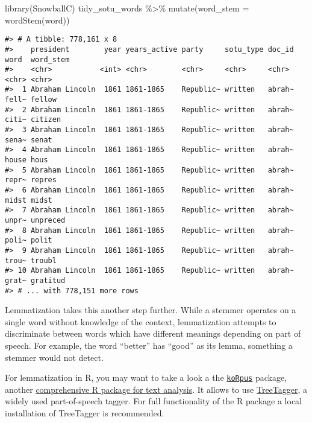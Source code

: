 \documentclass[
]{book}
\newenvironment{Shaded}{\begin{snugshade}}{\end{snugshade}}
\newcommand{\AttributeTok}[1]{\textcolor[rgb]{0.77,0.63,0.00}{#1}}
\newcommand{\FunctionTok}[1]{\textcolor[rgb]{0.00,0.00,0.00}{#1}}
\newcommand{\NormalTok}[1]{#1}
\newcommand{\SpecialCharTok}[1]{\textcolor[rgb]{0.00,0.00,0.00}{#1}}
\begin{document}
\begin{Shaded}
\begin{Highlighting}[]
\FunctionTok{library}\NormalTok{(SnowballC)}
\NormalTok{tidy\_sotu\_words }\SpecialCharTok{\%\textgreater{}\%}
        \FunctionTok{mutate}\NormalTok{(}\AttributeTok{word\_stem =} \FunctionTok{wordStem}\NormalTok{(word))}
\end{Highlighting}
\end{Shaded}

\begin{verbatim}
#> # A tibble: 778,161 x 8
#>    president        year years_active party     sotu_type doc_id word  word_stem
#>    <chr>           <int> <chr>        <chr>     <chr>     <chr>  <chr> <chr>    
#>  1 Abraham Lincoln  1861 1861-1865    Republic~ written   abrah~ fell~ fellow   
#>  2 Abraham Lincoln  1861 1861-1865    Republic~ written   abrah~ citi~ citizen  
#>  3 Abraham Lincoln  1861 1861-1865    Republic~ written   abrah~ sena~ senat    
#>  4 Abraham Lincoln  1861 1861-1865    Republic~ written   abrah~ house hous     
#>  5 Abraham Lincoln  1861 1861-1865    Republic~ written   abrah~ repr~ repres   
#>  6 Abraham Lincoln  1861 1861-1865    Republic~ written   abrah~ midst midst    
#>  7 Abraham Lincoln  1861 1861-1865    Republic~ written   abrah~ unpr~ unpreced 
#>  8 Abraham Lincoln  1861 1861-1865    Republic~ written   abrah~ poli~ polit    
#>  9 Abraham Lincoln  1861 1861-1865    Republic~ written   abrah~ trou~ troubl   
#> 10 Abraham Lincoln  1861 1861-1865    Republic~ written   abrah~ grat~ gratitud 
#> # ... with 778,151 more rows
\end{verbatim}

Lemmatization takes this another step further. While a stemmer operates on a single word without knowledge of the context, lemmatization attempts to discriminate between words which have different meanings depending on part of speech. For example, the word ``better'' has ``good'' as its lemma, something a stemmer would not detect.

For lemmatization in R, you may want to take a look a the \href{https://CRAN.R-project.org/package=koRpus}{\texttt{koRpus}} package, another \href{https://cran.r-project.org/web/packages/koRpus/vignettes/koRpus_vignette.html}{comprehensive R package for text analysis}. It allows to use \href{http://www.cis.uni-muenchen.de/~schmid/tools/TreeTagger/}{TreeTagger}, a widely used part-of-speech tagger. For full functionality of the R package a local installation of TreeTagger is recommended.
\end{document}
